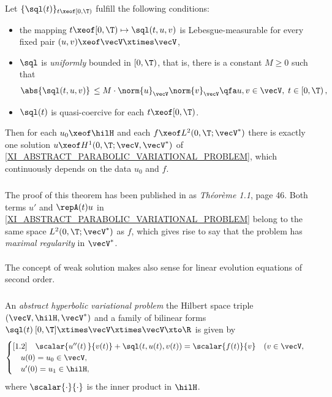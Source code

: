 \documentclass[11pt,twoside]{article}
\begin{document}
\begin{theorem1}\label{XI_LIONS_THEOREM_1}
Let $\{\sql(t)\}_{t \xeof [0,\T)}$ fulfill the following conditions:

\begin{itemize}[leftmargin=12pt]
\item[(a)]
the mapping $t \xeof [0,\T) \mapsto \sql(t,u,v)$ is Lebesgue-measurable
for every fixed pair $(u,v) \xeof \vecV \xtimes \vecV$,

\item[(b)]
$\sql$ is \textit{uniformly} bounded in $[0,\T)$,
that is,
there is a constant $M \geq 0$ such that
\[
\abs{\sql(t,u,v)} \, \leq M \cdot \norm{u}_{\vecV} \norm{v}_{\vecV}
\qfa u,v \in \vecV, \; t \in [0,\T)\,,
\]
\item[(c)]
$\sql(t)$ is quasi-coercive for each $t \xeof [0,\T)$.
\end{itemize}

Then for each $u_0 \xeof \hilH$ and each $f \xeof L^2(0,\T;\vecV^*)$
there is exactly one solution $u \xeof H^1(0,\T;\vecV,\vecV^*)$
of \eqref{XI_ABSTRACT_PARABOLIC_VARIATIONAL_PROBLEM},
which continuously depends on the data $u_0$ and $f$.
\end{theorem1}

\subparagraph{}
The proof of this theorem has been published in \cite{XI_Li}
as \textit{Th\'{e}or\`{e}me 1.1}, page 46.
Both terms $u'$ and $\repA(t) u$
in \eqref{XI_ABSTRACT_PARABOLIC_VARIATIONAL_PROBLEM}
belong to the same space $L^2(0,\T;\vecV^*)$ as $f$,
which gives rise to say
that the problem has \textit{maximal regularity} in $\vecV^*$.

\paragraph{} %
The concept of weak solution makes also sense
for linear evolution equations of second order.

\subparagraph{}
An \textit{abstract hyperbolic variational problem}
{\wrt} the Hilbert space triple $(\vecV,\hilH,\vecV^*)$ 
and a family of bilinear forms
$\sql(t)\:[0,\T] \xtimes \vecV \xtimes \vecV \xto \R$ is given by
\begin{equation}\label{XI_ABSTRACT_HYPERBOLIC_VARIATIONAL_PROBLEM}
\begin{cases}[1.2]
\quad \scalar{u''(t)\,}{v(t)} + \sql(t,u(t),v(t)) = \scalar{f(t)}{v} 
\quad (v \in \vecV, \\
\quad u(0)  = u_0 \in \vecV, \\
\quad u'(0) = u_1 \in \hilH, \\
\end{cases}
\end{equation}
where $\scalar{\cdot}{\cdot}$ is the inner product in $\hilH$.
\end{document}

